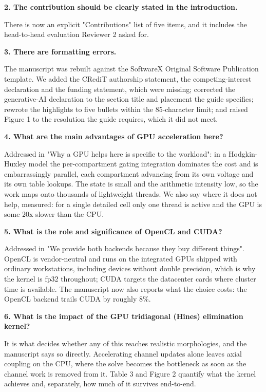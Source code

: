 \documentclass[11pt,a4paper]{article}
\begin{document}
\textbf{2. The contribution should be clearly stated in the introduction.}

There is now an explicit "Contributions" list of five items, and it includes the head-to-head evaluation Reviewer 2 asked for.

\textbf{3. There are formatting errors.}

The manuscript was rebuilt against the SoftwareX Original Software Publication template. We added the CRediT authorship statement, the competing-interest declaration and the funding statement, which were missing; corrected the generative-AI declaration to the section title and placement the guide specifies; rewrote the highlights to five bullets within the 85-character limit; and raised Figure 1 to the resolution the guide requires, which it did not meet.

\textbf{4. What are the main advantages of GPU acceleration here?}

Addressed in "Why a GPU helps here is specific to the workload": in a Hodgkin-Huxley model the per-compartment gating integration dominates the cost and is embarrassingly parallel, each compartment advancing from its own voltage and its own table lookups. The state is small and the arithmetic intensity low, so the work maps onto thousands of lightweight threads. We also say where it does not help, measured: for a single detailed cell only one thread is active and the GPU is some 20x slower than the CPU.

\textbf{5. What is the role and significance of OpenCL and CUDA?}

Addressed in "We provide both backends because they buy different things". OpenCL is vendor-neutral and runs on the integrated GPUs shipped with ordinary workstations, including devices without double precision, which is why the kernel is fp32 throughout; CUDA targets the datacenter cards where cluster time is available. The manuscript now also reports what the choice costs: the OpenCL backend trails CUDA by roughly 8\%.

\textbf{6. What is the impact of the GPU tridiagonal (Hines) elimination kernel?}

It is what decides whether any of this reaches realistic morphologies, and the manuscript says so directly. Accelerating channel updates alone leaves axial coupling on the CPU, where the solve becomes the bottleneck as soon as the channel work is removed from it. Table 3 and Figure 2 quantify what the kernel achieves and, separately, how much of it survives end-to-end.
\end{document}
